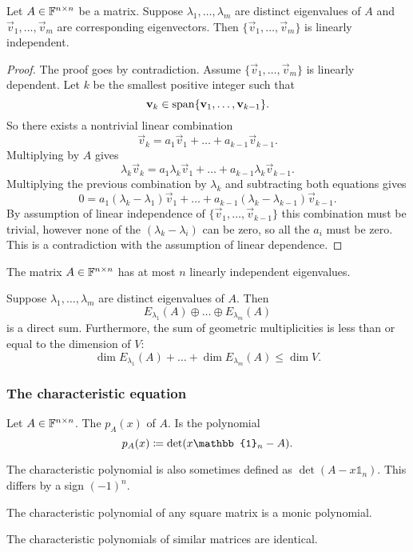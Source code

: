 \begin{proposition}
Let $A\in\mathbb{F}^{n\times n}$ be a matrix. Suppose $\lambda_1, \ldots, \lambda_m$ are distinct eigenvalues of $A$ and $\vec{v}_1,\ldots, \vec{v}_m$ are corresponding eigenvectors. Then $\{\vec{v}_1,\ldots, \vec{v}_m\}$ is linearly independent.
\end{proposition}
\begin{proof}
The proof goes by contradiction. Assume $\{\vec{v}_1,\ldots, \vec{v}_m\}$ is linearly dependent. Let $k$ be the smallest positive integer such that
\[ \boldsymbol{\mathrm{v}}_k \in \operatorname{span}\{\boldsymbol{\mathrm{v}}_1,\ldots, \boldsymbol{\mathrm{v}}_{k-1}\}. \]
So there exists a nontrivial linear combination
\[ \vec{v}_k = a_1\vec{v}_1+\ldots +a_{k-1}\vec{v}_{k-1}. \]
Multiplying by $A$ gives
\[ \lambda_k\vec{v}_k = a_1\lambda_k\vec{v}_1+\ldots +a_{k-1}\lambda_k\vec{v}_{k-1}. \]
Multiplying the previous combination by $\lambda_k$ and subtracting both equations gives
\[ 0= a_1(\lambda_k-\lambda_1)\vec{v}_1 +\ldots + a_{k-1}(\lambda_k - \lambda_{k-1})\vec{v}_{k-1}. \]
By assumption of linear independence of $\{\vec{v}_1,\ldots, \vec{v}_{k-1}\}$ this combination must be trivial, however none of the $(\lambda_k-\lambda_i)$ can be zero, so all the $a_i$ must be zero. This is a contradiction with the assumption of linear dependence.
\end{proof}
\begin{corollary}
The matrix $A\in\mathbb{F}^{n\times n}$ has at most $n$ linearly independent eigenvalues.
\end{corollary}
\begin{corollary}
Suppose $\lambda_1, \ldots, \lambda_m$ are distinct eigenvalues of $A$. Then
\[ E_{\lambda_1}(A) \oplus \ldots \oplus E_{\lambda_m}(A) \]
is a direct sum. Furthermore, the sum of geometric multiplicities is less than or equal to the dimension of $V$:
\[ \dim E_{\lambda_1}(A) + \ldots + \dim E_{\lambda_m}(A) \leq \dim V. \]
\end{corollary}

\subsubsection{The characteristic equation}
\begin{definition}
Let $A\in\mathbb{F}^{n\times n}$. The  $p_A(x)$ of $A$. Is the polynomial
\[ p_A(x) \defeq \det(x\mathbb{1}_n - A). \]
\end{definition}
The characteristic polynomial is also sometimes defined as $\det(A - x\mathbb{1}_n)$. This differs by a sign $(-1)^{n}$.
\begin{lemma}
The characteristic polynomial of any square matrix is a monic polynomial.
\end{lemma}
\begin{lemma}
The characteristic polynomials of similar matrices are identical.
\end{lemma}

